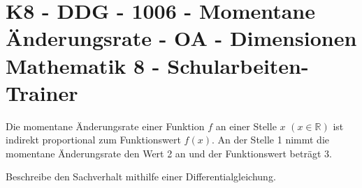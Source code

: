 \section{K8 - DDG - 1006 - Momentane Änderungsrate - OA - Dimensionen Mathematik 8 - Schularbeiten-Trainer}

\begin{beispiel}[K8 - DDG]{1}
Die momentane Änderungsrate einer Funktion $f$ an einer Stelle $x$ $(x\in\mathbb{R})$ ist indirekt proportional zum Funktionswert $f(x)$. An der Stelle 1 nimmt die momentane Änderungsrate den Wert 2 an und der Funktionswert beträgt 3.

Beschreibe den Sachverhalt mithilfe einer Differentialgleichung.

\end{beispiel}